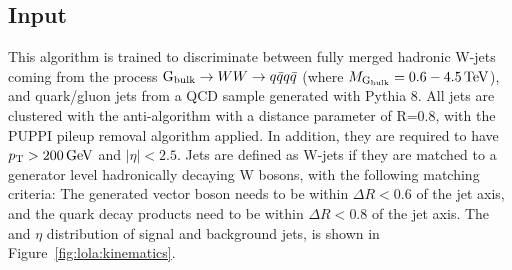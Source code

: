 \subsection{Input}
This algorithm is trained to discriminate between fully merged hadronic W-jets coming from the process $\mathrm{G}_\mathrm{bulk} \rightarrow WW \rightarrow q\bar{q}q\bar{q}$ (where $M_{\mathrm{G}_\mathrm{bulk}}=0.6-4.5\,\text{Te\hspace{-.08em}V}$), and quark/gluon jets from a QCD sample generated with Pythia 8. All jets are clustered with the anti-\kt algorithm with a distance parameter of R=0.8, with the PUPPI pileup removal algorithm applied. In addition, they are required to have $p_{\mathrm{T}} > 200 \,\text{Ge\hspace{-.08em}V}$ and $|\eta| < 2.5$. 
Jets are defined as W-jets if they are matched to a generator level hadronically decaying W bosons, with the following matching criteria:
The generated vector boson needs to be within $\Delta R < 0.6$ of the jet axis, and the quark decay products need to be within $\Delta R < 0.8$ of the jet axis. The \PT and $\eta$ distribution of signal and background jets, is shown in Figure~\ref{fig:lola:kinematics}.
